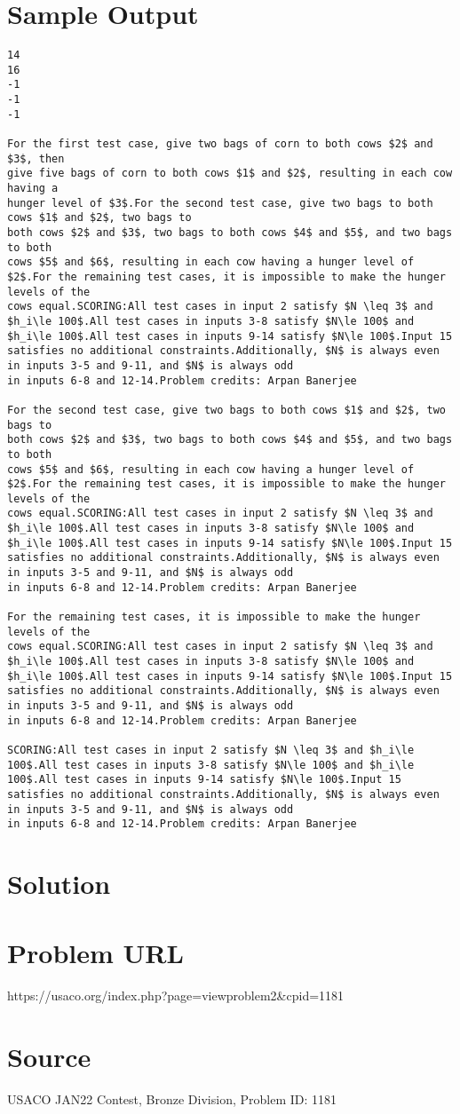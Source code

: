 \documentclass[12pt]{article}
\begin{document}
\section*{Sample Output}
\begin{verbatim}
14
16
-1
-1
-1

For the first test case, give two bags of corn to both cows $2$ and $3$, then
give five bags of corn to both cows $1$ and $2$, resulting in each cow having a
hunger level of $3$.For the second test case, give two bags to both cows $1$ and $2$, two bags to
both cows $2$ and $3$, two bags to both cows $4$ and $5$, and two bags to both
cows $5$ and $6$, resulting in each cow having a hunger level of $2$.For the remaining test cases, it is impossible to make the hunger levels of the
cows equal.SCORING:All test cases in input 2 satisfy $N \leq 3$ and $h_i\le 100$.All test cases in inputs 3-8 satisfy $N\le 100$ and $h_i\le 100$.All test cases in inputs 9-14 satisfy $N\le 100$.Input 15 satisfies no additional constraints.Additionally, $N$ is always even in inputs 3-5 and 9-11, and $N$ is always odd
in inputs 6-8 and 12-14.Problem credits: Arpan Banerjee

For the second test case, give two bags to both cows $1$ and $2$, two bags to
both cows $2$ and $3$, two bags to both cows $4$ and $5$, and two bags to both
cows $5$ and $6$, resulting in each cow having a hunger level of $2$.For the remaining test cases, it is impossible to make the hunger levels of the
cows equal.SCORING:All test cases in input 2 satisfy $N \leq 3$ and $h_i\le 100$.All test cases in inputs 3-8 satisfy $N\le 100$ and $h_i\le 100$.All test cases in inputs 9-14 satisfy $N\le 100$.Input 15 satisfies no additional constraints.Additionally, $N$ is always even in inputs 3-5 and 9-11, and $N$ is always odd
in inputs 6-8 and 12-14.Problem credits: Arpan Banerjee

For the remaining test cases, it is impossible to make the hunger levels of the
cows equal.SCORING:All test cases in input 2 satisfy $N \leq 3$ and $h_i\le 100$.All test cases in inputs 3-8 satisfy $N\le 100$ and $h_i\le 100$.All test cases in inputs 9-14 satisfy $N\le 100$.Input 15 satisfies no additional constraints.Additionally, $N$ is always even in inputs 3-5 and 9-11, and $N$ is always odd
in inputs 6-8 and 12-14.Problem credits: Arpan Banerjee

SCORING:All test cases in input 2 satisfy $N \leq 3$ and $h_i\le 100$.All test cases in inputs 3-8 satisfy $N\le 100$ and $h_i\le 100$.All test cases in inputs 9-14 satisfy $N\le 100$.Input 15 satisfies no additional constraints.Additionally, $N$ is always even in inputs 3-5 and 9-11, and $N$ is always odd
in inputs 6-8 and 12-14.Problem credits: Arpan Banerjee
\end{verbatim}

\section*{Solution}


\section*{Problem URL}
https://usaco.org/index.php?page=viewproblem2&cpid=1181

\section*{Source}
USACO JAN22 Contest, Bronze Division, Problem ID: 1181
\end{document}
